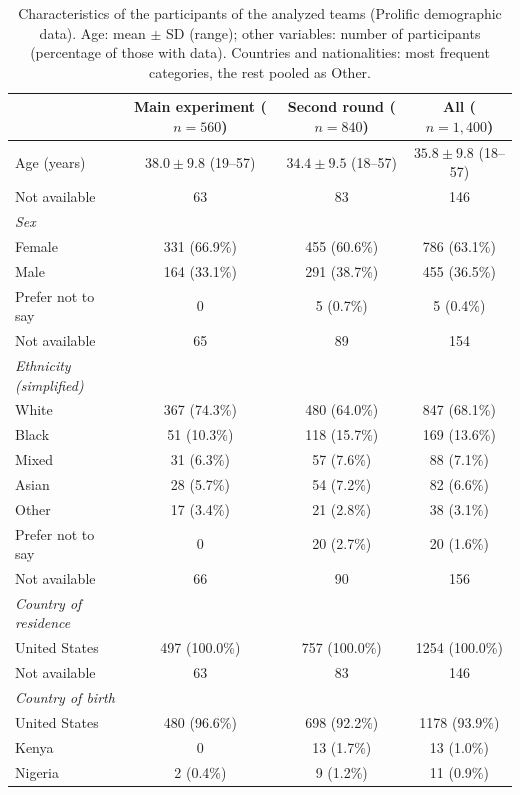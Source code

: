 \begin{table}[ht!]
\centering
\caption{Characteristics of the participants of the analyzed teams (Prolific demographic data). Age: mean $\pm$ SD (range); other variables: number of participants (percentage of those with data). Countries and nationalities: most frequent categories, the rest pooled as Other.}
\label{tab:si-demographics}
\small
\begin{tabular}{lccc}
\toprule
 & Main experiment ($n = 560$) & Second round ($n = 840$) & All ($n = 1{,}400$) \\
\midrule
Age (years) & $38.0 \pm 9.8$ (19--57) & $34.4 \pm 9.5$ (18--57) & $35.8 \pm 9.8$ (18--57) \\
\quad Not available & 63 & 83 & 146 \\
\addlinespace
\textit{Sex} & & & \\
\quad Female & 331 (66.9\%) & 455 (60.6\%) & 786 (63.1\%) \\
\quad Male & 164 (33.1\%) & 291 (38.7\%) & 455 (36.5\%) \\
\quad Prefer not to say & 0 & 5 (0.7\%) & 5 (0.4\%) \\
\quad Not available & 65 & 89 & 154 \\
\addlinespace
\textit{Ethnicity (simplified)} & & & \\
\quad White & 367 (74.3\%) & 480 (64.0\%) & 847 (68.1\%) \\
\quad Black & 51 (10.3\%) & 118 (15.7\%) & 169 (13.6\%) \\
\quad Mixed & 31 (6.3\%) & 57 (7.6\%) & 88 (7.1\%) \\
\quad Asian & 28 (5.7\%) & 54 (7.2\%) & 82 (6.6\%) \\
\quad Other & 17 (3.4\%) & 21 (2.8\%) & 38 (3.1\%) \\
\quad Prefer not to say & 0 & 20 (2.7\%) & 20 (1.6\%) \\
\quad Not available & 66 & 90 & 156 \\
\addlinespace
\textit{Country of residence} & & & \\
\quad United States & 497 (100.0\%) & 757 (100.0\%) & 1254 (100.0\%) \\
\quad Not available & 63 & 83 & 146 \\
\addlinespace
\textit{Country of birth} & & & \\
\quad United States & 480 (96.6\%) & 698 (92.2\%) & 1178 (93.9\%) \\
\quad Kenya & 0 & 13 (1.7\%) & 13 (1.0\%) \\
\quad Nigeria & 2 (0.4\%) & 9 (1.2\%) & 11 (0.9\%) \\

\end{tabular}
\end{table}
